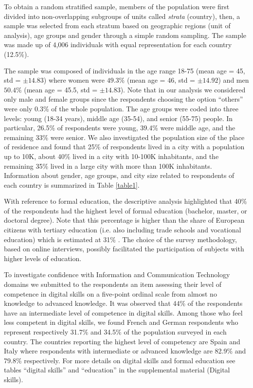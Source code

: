 \documentclass{article}
\begin{document}
To obtain a random stratified sample, members of the population were first divided into non-overlapping subgroups of units called \emph{strata} (country), then, a sample was selected from each stratum based on geographic regions (unit of analysis), age groups and gender through a simple random sampling. The sample was made up of 4,006 individuals with equal representation for each country (12.5\%). 

The sample was composed of individuals in the age range 18-75 (mean age = 45, std = $\pm{14.83}$) where women were $49.3\%$ (mean age = 46, std = $\pm{14.92}$) and men $50.4\%$ (mean age = 45.5, std = $\pm{14.83}$). Note that in our analysis we considered only male and female groups since the respondents choosing the option ``others'' were only 0.3\% of the whole population. The age groups were coded into three levels: young (18-34 years), middle age (35-54), and senior (55-75) people. In particular, 26.5\% of respondents were young, 39.4\% were middle age, and the remaining 33\% were senior. We also investigated the population size of the place of residence and found that 25\% of respondents lived in a city with a population up to 10K, about 40\% lived in a city with 10-100K inhabitants, and the remaining 35\% lived in a large city with more than 100K inhabitants. Information about gender, age groups, and city size related to respondents of each country is summarized in Table \ref{table1}.

With reference to formal education, the descriptive analysis highlighted that 40\% of the respondents had the highest level of formal education (bachelor, master, or doctoral degree). Note that this percentage is higher than the share of European citizens with tertiary education (i.e. also including trade schools and vocational education) which is estimated at 31\% \cite{eurostat2021educational}. The choice of the survey methodology, based on online interviews, possibly facilitated the participation of subjects with higher levels of education.  

To investigate confidence with Information and Communication Technology domains we submitted to the respondents an item assessing their level of competence in digital skills on a five-point ordinal scale from almost no knowledge to advanced knowledge. It was observed that 44\% of the respondents have an intermediate level of competence in digital skills. Among those who feel less competent in digital skills, we found French and German respondents who represent respectively 31.7\% and 34.5\% of the population surveyed in each country. The countries reporting the highest level of competency are Spain and Italy where respondents with intermediate or advanced knowledge are 82.9\% and 79.8\% respectively. For more details on digital skills and formal education see tables ``digital skills'' and ``education'' in the supplemental material (Digital skills).
\end{document}
